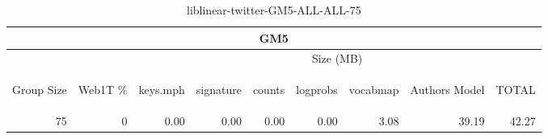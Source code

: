 \begin{center}
\begin{table}[htbp]
\begin{tabular}{ | r | r | r | r | r | r | r | r | r |}
\hline
\multicolumn{9}{|c|}{GM5}\\
\hline
 & & \multicolumn{7}{|c|}{Size (MB)}\\ \cline{3-9}
\begin{sideways}Group Size\end{sideways} & \begin{sideways}Web1T \% \end{sideways} & \begin{sideways}keys.mph\end{sideways} & \begin{sideways}signature\end{sideways} & \begin{sideways}counts\end{sideways} & \begin{sideways}logprobs\end{sideways} & \begin{sideways}vocabmap\end{sideways} & \begin{sideways}Authors Model \end{sideways} & \begin{sideways}TOTAL\end{sideways}\\
\hline
\multirow{0}{*}{75}
 & 0 & 0.00 & 0.00 & 0.00 & 0.00 & 3.08 & 39.19 & 42.27\\ \cline{2-9}
\hline
\end{tabular}
\caption{liblinear-twitter-GM5-ALL-ALL-75}
\label{table:liblinear-twitter-GM5-ALL-ALL-75}
\end{table}
\end{center}

